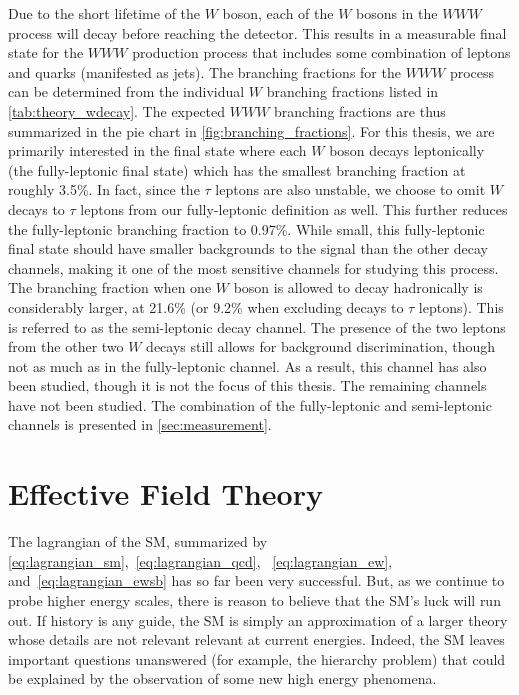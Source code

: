 Due to the short lifetime of the $W$ boson, each of the $W$ bosons
in the $WWW$ process will decay before reaching the detector.
This results in a measurable final state for the $WWW$ production 
process that includes some combination of leptons 
and quarks (manifested as jets).  The branching fractions for 
the $WWW$ process can be determined from the individual $W$ branching fractions
listed in \tab\ref{tab:theory_wdecay}.  The expected $WWW$ branching
fractions are thus summarized in the pie chart in \fig\ref{fig:branching_fractions}.
For this thesis, we are primarily interested in the final state
where each $W$ boson decays leptonically (the fully-leptonic final state) 
which has the smallest branching fraction at roughly 3.5\%.
In fact, since the $\tau$ leptons are also unstable, we choose to 
omit $W$ decays to $\tau$ leptons from our fully-leptonic
definition as well. This further reduces the fully-leptonic 
branching fraction to 0.97\%.  While small, this fully-leptonic final state
should have smaller backgrounds to the signal than the other 
decay channels, making it one of the most sensitive channels for studying
this process. The branching fraction when one $W$ boson is allowed
to decay hadronically is considerably larger, at 21.6\% (or
9.2\% when excluding decays to $\tau$ leptons). This is 
referred to as the semi-leptonic decay channel. The presence
of the two leptons from the other two $W$ decays still allows
for background discrimination, though not as much as in the fully-leptonic
channel. As a result, this channel has also been studied, though it 
is not the focus of this thesis. The remaining channels have
not been studied. The combination of the fully-leptonic
and semi-leptonic channels is presented in \sec\ref{sec:measurement}.



\section{Effective Field Theory}

The lagrangian of the SM, summarized by 
\eqn\eqref{eq:lagrangian_sm},~\eqref{eq:lagrangian_qcd},
~\eqref{eq:lagrangian_ew}, and~\eqref{eq:lagrangian_ewsb}
has so far been very successful. 
But, as we continue to probe higher energy scales, 
there is reason to believe that the SM's luck will run out.
If history is any guide, the SM is simply
an approximation of a larger theory whose details are not relevant
relevant at current energies.
Indeed, the SM leaves important questions unanswered (for example, 
the hierarchy problem) that could be explained
by the observation of some new high energy phenomena.  %

